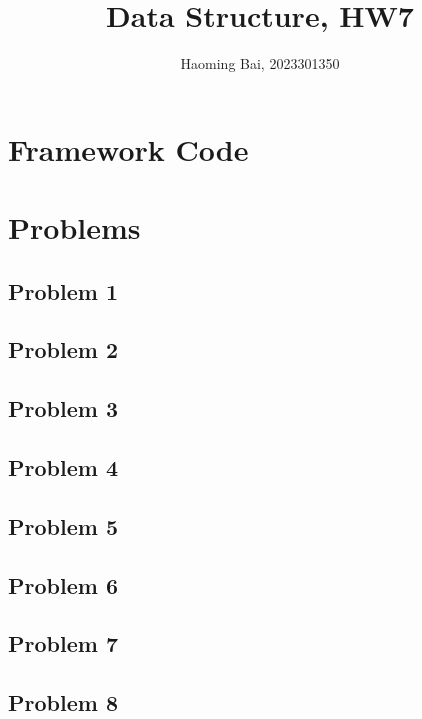\documentclass{ctexart}
\title{Data Structure, HW7}
\author{Haoming Bai, 2023301350}
\begin{document}
	\maketitle
  \tableofcontents
  \section{Framework Code}
  

  \section{Problems}
  \subsection{Problem 1}
  
  \subsection{Problem 2}
  
  \subsection{Problem 3}
  
  \subsection{Problem 4}
  
  \subsection{Problem 5}
  
  \subsection{Problem 6}
  
  \subsection{Problem 7}
  
  \subsection{Problem 8}
  
\end{document}
